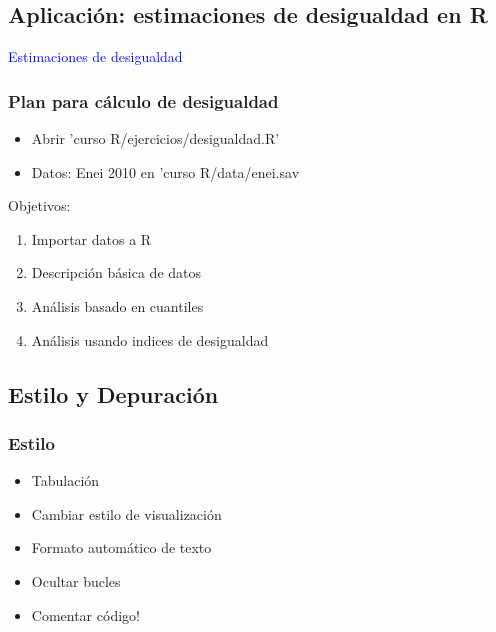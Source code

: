 \documentclass{beamer}
\begin{document}
\subsection{Aplicaci\'on: estimaciones de desigualdad en R}

\begin{frame}
 \begin{center}
  \Huge \textcolor{blue}{Estimaciones de desigualdad}
 \end{center}
\end{frame}

\begin{frame}
 \frametitle{Plan para c\'alculo de desigualdad}
 \begin{itemize}
  \item Abrir 'curso R/ejercicios/desigualdad.R'
  \item Datos: Enei 2010 en 'curso R/data/enei.sav
  \end{itemize} 
Objetivos:
   \begin{enumerate}
    \item Importar datos a R
    \item Descripci\'on b\'asica de datos
    \item An\'alisis basado en cuantiles 
    \item An\'alisis usando indices de desigualdad
   \end{enumerate}
\end{frame}


\subsection{Estilo y Depuraci\'on}
\frame{\tableofcontents[currentsection]}

 \begin{frame}
 \frametitle{Estilo}
      \begin{itemize}
 	    \item Tabulaci\'on
 	    \item Cambiar estilo de visualizaci\'on
 	    \item Formato autom\'atico de texto
 	    \item Ocultar bucles
 	    \item Comentar c\'odigo!
  	   \end{itemize}
\end{frame}

\end{document}
